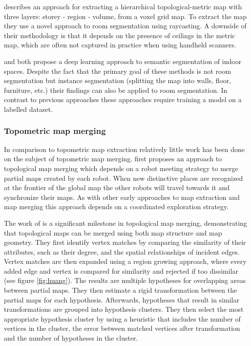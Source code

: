 \citet{he_hierarchical_2021} describes an approach for extracting a hierarchical topological-metric map with three layers: storey - region - volume, from a voxel grid map. To extract the map they use a novel approach to room segmentation using raycasting. A downside of their methodology is that it depends on the presence of ceilings in the metric map, which are often not captured in practice when using handheld scanners. 



\citet{ma_semantic_2020} and \citet{tang_bim_2022} both propose a deep learning approach to semantic segmentation of indoor spaces. Despite the fact that the primary goal of these methods is not room segmentation but instance segmentation (splitting the map into walls, floor, furniture, etc.) their findings can also be applied to room segmentation. In contrast to previous approaches these approaches require training a model on a labelled dataset.

\subsubsection{Topometric map merging}
In comparison to topometric map extraction relatively little work has been done on the subject of topometric map merging. \citet{dudek_topological_1998} first proposes an approach to topological map merging which depends on a robot meeting strategy to merge partial maps created by each robot. When new distinctive places are recognized at the frontier of the global map the other robots will travel towards it and synchronize their maps. As with other early approaches to map extraction and map merging this approach depends on a coordinated exploration strategy.

The work of \citet{huang_topological_2005} is a significant milestone in topological map merging, demonstrating that topological maps can be merged using both map structure and map geometry. They first identify vertex matches by comparing the similarity of their attributes, such as their degree, and the spatial relationships of incident edges. Vertex matches are then expanded using a region growing approach, where every added edge and vertex is compared for similarity and rejected if too dissimilar (see figure \ref{fig:huang}). The results are multiple hypotheses for overlapping areas between partial maps. They then estimate a rigid transformation between the partial maps for each hypothesis. Afterwards, hypotheses that result in similar transformations are grouped into hypothesis clusters. They then select the most appropriate hypothesis cluster by using a heuristic that includes the number of vertices in the cluster, the error between matched vertices after transformation and the number of hypotheses in the cluster.


